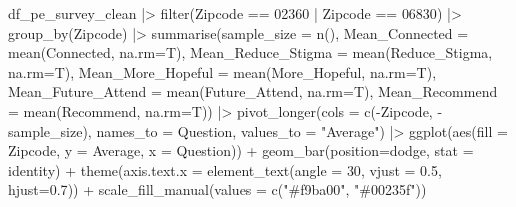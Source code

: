 \documentclass[
  letterpaper,
  DIV=11,
  numbers=noendperiod]{scrartcl}
\newenvironment{Shaded}{\begin{snugshade}}{\end{snugshade}}
\newcommand{\AttributeTok}[1]{\textcolor[rgb]{0.40,0.45,0.13}{#1}}
\newcommand{\DecValTok}[1]{\textcolor[rgb]{0.68,0.00,0.00}{#1}}
\newcommand{\FloatTok}[1]{\textcolor[rgb]{0.68,0.00,0.00}{#1}}
\newcommand{\FunctionTok}[1]{\textcolor[rgb]{0.28,0.35,0.67}{#1}}
\newcommand{\NormalTok}[1]{\textcolor[rgb]{0.00,0.23,0.31}{#1}}
\newcommand{\SpecialCharTok}[1]{\textcolor[rgb]{0.37,0.37,0.37}{#1}}
\newcommand{\StringTok}[1]{\textcolor[rgb]{0.13,0.47,0.30}{#1}}
\begin{document}
\begin{Shaded}
\begin{Highlighting}[]
\NormalTok{df\_pe\_survey\_clean }\SpecialCharTok{|\textgreater{}} 
  \FunctionTok{filter}\NormalTok{(Zipcode }\SpecialCharTok{==} \StringTok{\textquotesingle{}02360\textquotesingle{}} \SpecialCharTok{|}
\NormalTok{         Zipcode }\SpecialCharTok{==} \StringTok{\textquotesingle{}06830\textquotesingle{}}\NormalTok{) }\SpecialCharTok{|\textgreater{}} 
  \FunctionTok{group\_by}\NormalTok{(Zipcode) }\SpecialCharTok{|\textgreater{}} 
  \FunctionTok{summarise}\NormalTok{(}\AttributeTok{sample\_size =} \FunctionTok{n}\NormalTok{(),}
            \AttributeTok{Mean\_Connected =} \FunctionTok{mean}\NormalTok{(Connected, }\AttributeTok{na.rm=}\NormalTok{T),}
            \AttributeTok{Mean\_Reduce\_Stigma =} \FunctionTok{mean}\NormalTok{(Reduce\_Stigma, }\AttributeTok{na.rm=}\NormalTok{T),}
            \AttributeTok{Mean\_More\_Hopeful =} \FunctionTok{mean}\NormalTok{(More\_Hopeful, }\AttributeTok{na.rm=}\NormalTok{T),}
            \AttributeTok{Mean\_Future\_Attend =} \FunctionTok{mean}\NormalTok{(Future\_Attend, }\AttributeTok{na.rm=}\NormalTok{T),}
            \AttributeTok{Mean\_Recommend =} \FunctionTok{mean}\NormalTok{(Recommend, }\AttributeTok{na.rm=}\NormalTok{T)) }\SpecialCharTok{|\textgreater{}} 
  \FunctionTok{pivot\_longer}\NormalTok{(}\AttributeTok{cols =} \FunctionTok{c}\NormalTok{(}\SpecialCharTok{{-}}\NormalTok{Zipcode, }\SpecialCharTok{{-}}\NormalTok{sample\_size),}
               \AttributeTok{names\_to =} \StringTok{\textquotesingle{}Question\textquotesingle{}}\NormalTok{,}
               \AttributeTok{values\_to =} \StringTok{"Average"}\NormalTok{) }\SpecialCharTok{|\textgreater{}} 
  \FunctionTok{ggplot}\NormalTok{(}\FunctionTok{aes}\NormalTok{(}\AttributeTok{fill =}\NormalTok{ Zipcode, }\AttributeTok{y =}\NormalTok{ Average, }\AttributeTok{x =}\NormalTok{ Question)) }\SpecialCharTok{+}
  \FunctionTok{geom\_bar}\NormalTok{(}\AttributeTok{position=}\StringTok{\textquotesingle{}dodge\textquotesingle{}}\NormalTok{, }\AttributeTok{stat =} \StringTok{\textquotesingle{}identity\textquotesingle{}}\NormalTok{) }\SpecialCharTok{+}
  \FunctionTok{theme}\NormalTok{(}\AttributeTok{axis.text.x =} \FunctionTok{element\_text}\NormalTok{(}\AttributeTok{angle =} \DecValTok{30}\NormalTok{, }\AttributeTok{vjust =} \FloatTok{0.5}\NormalTok{, }\AttributeTok{hjust=}\FloatTok{0.7}\NormalTok{)) }\SpecialCharTok{+}
  \FunctionTok{scale\_fill\_manual}\NormalTok{(}\AttributeTok{values =} \FunctionTok{c}\NormalTok{(}\StringTok{"\#f9ba00"}\NormalTok{,}
                               \StringTok{"\#00235f"}\NormalTok{))}
\end{Highlighting}
\end{Shaded}
\end{document}

